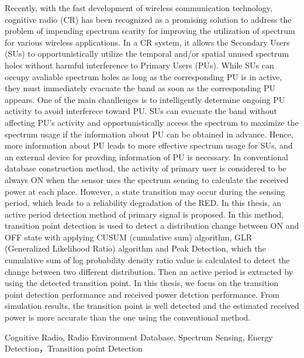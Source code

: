 \documentclass[technicalreport]{ieicej}
\begin{document}
\begin{eabstract}
Recently, with the fast development of wireless communication technology, cognitive radio (CR) has been recognized as a promising solution to address the problem of impending spectrum scarity for improving the utilization of spectrum for various wireless applications. In a CR system, it allows the Secondary Users (SUs) to opportunistically utilize the temporal and/or spatial unused spectrum holes without harmful interference to Primary Users (PUs). While SUs can occupy avaliable spectrum holes as long as the corresponding PU is in active, they must immediately evacuate the band as soon as the corresponding PU appears. One of the main chanllenges is to intelligently determine ongoing PU activity to avoid interferece toward PU. SUs can evacuate the band without affecting PU’s activity and opportunistically access the spectrum to maximize the spectrum usage if the information about PU can be obtained in advance. Hence, more information about PU leads to more effective spectrum usage for SUs, and an external device for provding information of PU is necessary. In conventional database construction method, the activity of primary user is considered to be always ON when the sensor uses the spectrum sensing to calculate the received power at each place. However, a state transition may occur during the sensing period, which leads to a reliability degradation of the RED. In this thesis, an active period detection method of primary signal is proposed. In this method, transition point detection is used to detect a distribution change between ON and OFF state with applying CUSUM (cumulative sum) algorithm, GLR (Generalized Likelihood Ratio) algorithm and Peak Detection, which the cumulative sum of log probability density ratio value is calculated to detect the change between two different distribution.  Then an active period is extracted by using the detected transition point. In this thesis, we focus on the transition point detection performance and received power detction performance. From simulation results, the transition point is well detected and the estimated received power is more accurate than the one using the conventional method.

\end{eabstract}
\begin{ekeyword}
Cognitive Radio, Radio Environment Database, Spectrum Sensing, Energy Detection，Transition point Detection
\end{ekeyword}
\maketitle
\end{document}
